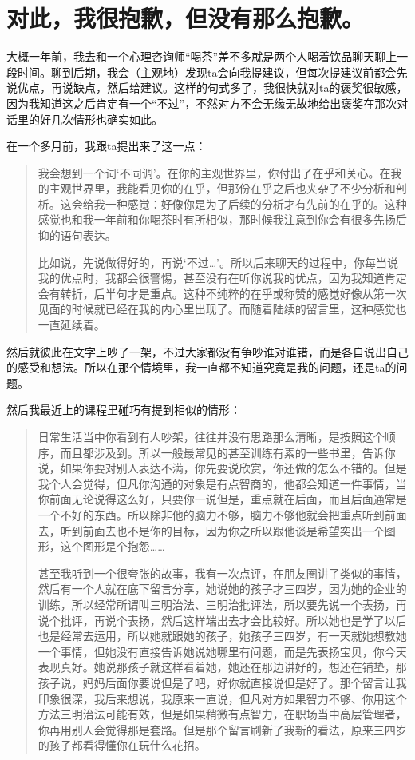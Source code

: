 \chapter{对此，我很抱歉，但没有那么抱歉。}



大概一年前，我去和一个心理咨询师“喝茶”\pozhehao{}差不多就是两个人喝着饮品聊天聊上一段时间。聊到后期，我会（主观地）发现ta会向我提建议，但每次提建议前都会先说优点，再说缺点，然后给建议。这样的句式多了，我很快就对ta的褒奖很敏感，因为我知道这之后肯定有一个“不过”，不然对方不会无缘无故地给出褒奖\pozhehao{}在那次对话里的好几次情形也确实如此。

在一个多月前，我跟ta提出来了这一点：

\blockquote{
我会想到一个词‘不同调’。在你的主观世界里，你付出了在乎和关心。在我的主观世界里，我能看见你的在乎，但那份在乎之后也夹杂了不少分析和剖析。这会给我一种感觉：好像你是为了后续的分析才有先前的在乎的。这种感觉也和我一年前和你喝茶时有所相似，那时候我注意到你会有很多先扬后抑的语句表达。

比如说，先说做得好的，再说‘不过…’。所以后来聊天的过程中，你每当说我的优点时，我都会很警惕，甚至没有在听你说我的优点，因为我知道肯定会有转折，后半句才是重点。这种不纯粹的在乎或称赞的感觉好像从第一次见面的时候就已经在我的内心里出现了。而随着陆续的留言里，这种感觉也一直延续着。
}

然后就彼此在文字上吵了一架，不过大家都没有争吵谁对谁错，而是各自说出自己的感受和想法。所以在那个情境里，我一直都不知道究竟是我的问题，还是ta的问题。

然后我最近上的课程里碰巧有提到相似的情形：

\blockquote{
日常生活当中你看到有人吵架，往往并没有思路那么清晰，是按照这个顺序，而且都涉及到。所以一般最常见的甚至训练有素的一些书里，告诉你说，如果你要对别人表达不满，你先要说欣赏，你还做的怎么不错的。但是我个人会觉得，但凡你沟通的对象是有点智商的，他都会知道一件事情，当你前面无论说得这么好，只要你一说但是，重点就在后面，而且后面通常是一个不好的东西。所以除非他的脑力不够，脑力不够他就会把重点听到前面去，听到前面去也不是你的目标，因为你之所以跟他谈是希望突出一个图形，这个图形是个抱怨……

甚至我听到一个很夸张的故事，我有一次点评，在朋友圈讲了类似的事情，然后有一个人就在底下留言分享，她说她的孩子才三四岁，因为她的企业的训练，所以经常所谓叫三明治法、三明治批评法，所以要先说一个表扬，再说个批评，再说个表扬，然后这样端出去才会比较好。所以她也是学了以后也是经常去运用，所以她就跟她的孩子，她孩子三四岁，有一天就她想教她一个事情，但她没有直接告诉她说她哪里有问题，而是先表扬宝贝，你今天表现真好。她说那孩子就这样看着她，她还在那边讲好的，想还在铺垫，那孩子说，妈妈后面你要说但是了吧，好你就直接说但是好了。那个留言让我印象很深，我后来想说，我原来一直说，但凡对方如果智力不够、你用这个方法三明治法可能有效，但是如果稍微有点智力，在职场当中高层管理者，你再用别人会觉得那是套路。但是那个留言刷新了我新的看法，原来三四岁的孩子都看得懂你在玩什么花招。
}

